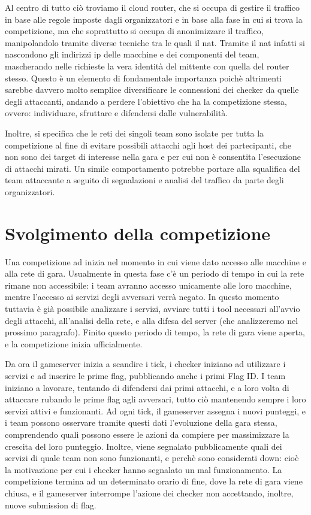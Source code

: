 Al centro di tutto ciò troviamo il cloud router, che si occupa di gestire il traffico in base alle regole imposte dagli organizzatori e in base alla fase in cui si trova la competizione, ma che soprattutto si occupa di anonimizzare il traffico, manipolandolo tramite diverse tecniche tra le quali il \gls{nat}. Tramite il \gls{nat} infatti si nascondono gli indirizzi \gls{ip} delle macchine e dei componenti del team, mascherando nelle richieste la vera identità del mittente con quella del router stesso. Questo è un elemento di fondamentale importanza poichè altrimenti sarebbe davvero molto semplice diversificare le connessioni dei checker da quelle degli attaccanti, andando a perdere l'obiettivo che ha la competizione stessa, ovvero: individuare, sfruttare e difendersi dalle vulnerabilità.

Inoltre, si specifica che le reti dei singoli team sono isolate per tutta la competizione al fine di evitare possibili attacchi agli host dei partecipanti, che non sono dei target di interesse nella gara e per cui non è consentita l'esecuzione di attacchi mirati.
Un simile comportamento potrebbe portare alla squalifica del team attaccante a seguito di segnalazioni e analisi del traffico da parte degli organizzatori.

\section{Svolgimento della competizione}

Una competizione \gls{ad} inizia nel momento in cui viene dato accesso alle macchine e alla rete di gara. Usualmente in questa fase c'è un periodo di tempo in cui la rete rimane non accessibile: i team avranno accesso unicamente alle loro macchine, mentre l'accesso ai servizi degli avversari verrà negato. In questo momento tuttavia è già possibile analizzare i servizi, avviare tutti i tool necessari all'avvio degli attacchi, all'analisi della rete, e alla difesa del server (che analizzeremo nel prossimo paragrafo). Finito questo periodo di tempo, la rete di gara viene aperta, e la competizione inizia ufficialmente.

Da ora il gameserver inizia a scandire i tick, i checker iniziano ad utilizzare i servizi e ad inserire le prime flag, pubblicando anche i primi Flag ID.
I team iniziano a lavorare, tentando di difendersi dai primi attacchi, e a loro volta di attaccare rubando le prime flag agli avversari, tutto ciò mantenendo sempre i loro servizi attivi e funzionanti. Ad ogni tick, il gameserver assegna i nuovi punteggi, e i team possono osservare tramite questi dati l'evoluzione della gara stessa, comprendendo quali possono essere le azioni da compiere per massimizzare la crescita del loro punteggio.
Inoltre, viene segnalato pubblicamente quali dei servizi di quale team non sono funzionanti, e perchè sono considerati down: cioè la motivazione per cui i checker hanno segnalato un mal funzionamento.
La competizione termina ad un determinato orario di fine, dove la rete di gara viene chiusa, e il gameserver interrompe l'azione dei checker non accettando, inoltre, nuove submission di flag.


